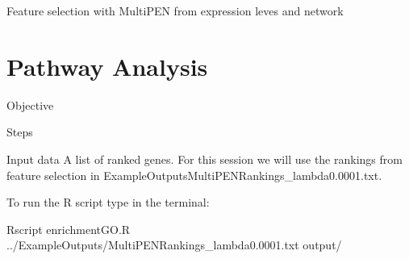 \documentclass[11pt, oneside]{article}   	%
\begin{document}
Feature selection with MultiPEN from expression leves and network 


\section{Pathway Analysis}

Objective

Steps

Input data
A list of ranked genes. For this session we will use the rankings from feature selection in ExampleOutputs\/MultiPEN\-Rankings\_lambda0.0001.txt.

To run the R script type in the terminal:

Rscript enrichmentGO.R ../ExampleOutputs/MultiPEN\-Rankings\_lambda0.0001.txt output/







%

\end{document}
